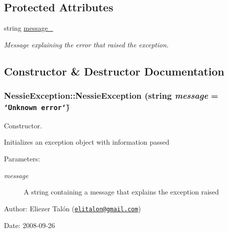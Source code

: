 \subsection*{Protected Attributes}
\begin{CompactItemize}
\item 
\hypertarget{class_nessie_exception_dfc0c53684fe26e2199beeb9b62841f5}{
string \hyperlink{class_nessie_exception_dfc0c53684fe26e2199beeb9b62841f5}{message\_\-}}
\label{class_nessie_exception_dfc0c53684fe26e2199beeb9b62841f5}

\begin{CompactList}\small\item\em Message explaining the error that raised the exception. \item\end{CompactList}\end{CompactItemize}


\subsection{Constructor \& Destructor Documentation}
\hypertarget{class_nessie_exception_1287f5b04f2f46162fcfae79699dcae7}{
\subsubsection[NessieException]{\setlength{\rightskip}{0pt plus 5cm}NessieException::NessieException (string {\em message} = {\tt \char`\"{}Unknown~error\char`\"{}})}}
\label{class_nessie_exception_1287f5b04f2f46162fcfae79699dcae7}


Constructor. 

Initializes an exception object with information passed

\begin{Desc}
\item[Parameters:]
\begin{description}
\item[{\em message}]A string containing a message that explains the exception raised\end{description}
\end{Desc}
\begin{Desc}
\item[Author:]Eliezer Talón (\href{mailto:elitalon@gmail.com}{\tt elitalon@gmail.com}) \end{Desc}
\begin{Desc}
\item[Date:]2008-09-26 \end{Desc}


